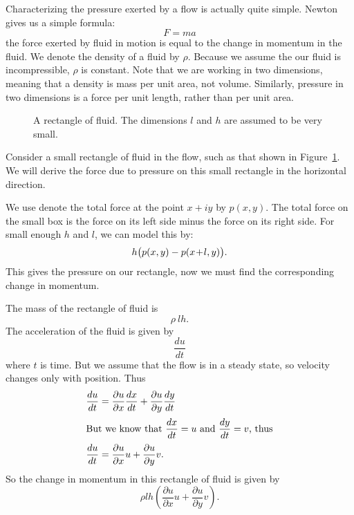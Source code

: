 \documentclass[letterpaper, twoside, 12 pt]{article}
\begin{document}
	Characterizing the pressure exerted by a flow is actually quite simple.
	Newton gives us a simple formula:
	\[
		F = ma
	\]
	the force exerted by fluid in motion is equal to the change in momentum in the fluid.
	We denote the density of a fluid by $\rho$.
	Because we assume the our fluid is incompressible, $\rho$ is constant.
	Note that we are working in two dimensions, meaning that a density is mass per unit area, not volume.
	Similarly, pressure in two dimensions is a force per unit length, rather than per unit area.


	\begin{figure}[H]
		\centering
		\begin{tikzpicture}
			
		\end{tikzpicture}
		\captionsetup{width = 0.5 \textwidth}
		\caption{
			A rectangle of fluid.
			The dimensions $l$ and $h$ are assumed to be very small.
		}
		\label{fig:pressure_rectangle}
	\end{figure}

	Consider a small rectangle of fluid in the flow, such as that shown in Figure~\ref{fig:pressure_rectangle}.
	We will derive the force due to pressure on this small rectangle in the horizontal direction.
	
	We use denote the total force at the point $x + iy$ by $p(x, y)$.
	The total force on the small box is the force on its left side minus the force on its right side.
	For small enough $h$ and $l$, we can model this by:
	\[
		h \big( p(x, y) - p(x \tp l, y) \big).
	\]
	This gives the pressure on our rectangle, now we must find the corresponding change in momentum.

	The mass of the rectangle of fluid is
	\[
		\rho \> lh.
	\]
	The acceleration of the fluid is given by 
	\[
		\frac{du}{dt}
	\]
	where $t$ is time.
	But we assume that the flow is in a steady state, so velocity changes only with position.
	Thus
	\begin{align*}
	\frac{du}{dt} &= \frac{\partial u}{\partial x} \frac{dx}{dt} + \frac{\partial u}{\partial y} \frac{dy}{dt} \\
	\intertext{But we know that $\displaystyle\frac{dx}{dt} = u$ and $\displaystyle\frac{dy}{dt} = v$, thus}
	\frac{du}{dt} &= \frac{\partial u}{\partial x} u + \frac{\partial u}{\partial y} v.
	\end{align*}
	So the change in momentum in this rectangle of fluid is given by
	\[
		\rho lh \left( \frac{\partial u}{\partial x} u + \frac{\partial u}{\partial y} v \right).
	\]
\end{document}
